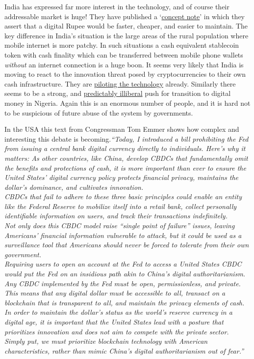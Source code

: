 India has expressed far more interest in the technology, and of course their addressable market is huge! They have published a  `\href{https://twitter.com/RBI/status/1578329048446828544?}{concept note}' in which they assert that a digital Rupee would be faster, cheaper, and easier to maintain. The key difference in India's situation is the large areas of the rural population where mobile internet is more patchy. In such situations a cash equivalent stablecoin token with cash finality which can be transferred between mobile phone wallets \textit{without} an internet connection is a huge boon. It seems very likely that India is moving to react to the innovation threat posed by cryptocurrencies to their own cash infrastructure. They are \href{https://www.reuters.com/article/idUSKBN2RQ0WO}{piloting the technology} already. Similarly there seems to be a strong, and \href{https://www.bloomberg.com/news/articles/2022-12-06/nigeria-limits-cash-transactions-to-push-enaira-and-other-payments}{predictably illiberal} push for transition to digital money in Nigeria. Again this is an enormous number of people, and it is hard not to be suspicious of future abuse of the system by governments.\par
In the USA this text from Congressman Tom Emmer shows how complex and interesting this debate is becoming.\textit{``Today, I introduced a bill prohibiting the Fed from issuing a central bank digital currency directly to individuals. Here’s why it matters: As other countries, like China, develop CBDCs that fundamentally omit the benefits and protections of cash, it is more important than ever to ensure the United States’ digital currency policy protects financial privacy, maintains the dollar’s dominance, and cultivates innovation.\\
CBDCs that fail to adhere to these three basic principles could enable an entity like the Federal Reserve to mobilize itself into a retail bank, collect personally identifiable information on users, and track their transactions indefinitely.\\
Not only does this CBDC model raise ``single point of failure'' issues, leaving Americans’ financial information vulnerable to attack, but it could be used as a surveillance tool that Americans should never be forced to tolerate from their own government.\\
Requiring users to open an account at the Fed to access a United States CBDC would put the Fed on an insidious path akin to China’s digital authoritarianism.\\
Any CBDC implemented by the Fed must be open, permissionless, and private. This means that any digital dollar must be accessible to all, transact on a blockchain that is transparent to all, and maintain the privacy elements of cash.\\
In order to maintain the dollar’s status as the world’s reserve currency in a digital age, it is important that the United States lead with a posture that prioritizes innovation and does not aim to compete with the private sector.\\
Simply put, we must prioritize blockchain technology with American characteristics, rather than mimic China’s digital authoritarianism out of fear.''}\par
